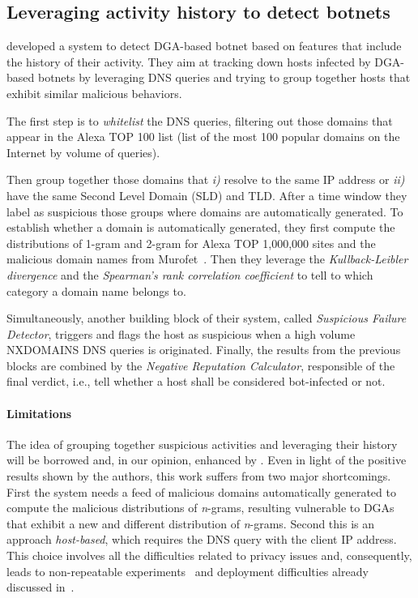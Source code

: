 \subsection{Leveraging activity history to detect botnets} %
\label{sub:a_novel_reputation_system_to_detect_dga_based_botnets}
\citet{sharifnya2013} developed a system to detect DGA-based botnet based on
features that include
the history of their activity. They aim at tracking down hosts infected by DGA-based
botnets by leveraging DNS queries and trying to group together hosts that exhibit
similar malicious behaviors.

The first step is to \emph{whitelist} the DNS queries, filtering
out those domains that appear in the Alexa TOP 100 list (list of the most 100 popular
domains on the Internet by volume of queries).

Then \citet{sharifnya2013} group together those domains that \emph{i)} resolve to
the same IP address or \emph{ii)} have the same Second Level Domain (SLD) and TLD. After a time window
they label as suspicious those groups where domains are automatically generated. To
establish whether a domain is automatically generated, they first compute
the distributions of 1-gram and 2-gram for Alexa TOP 1,000,000 sites and the
malicious domain names from Murofet~\cite{sharifnya2013}. Then they leverage the
\emph{Kullback-Leibler divergence} and the \emph{Spearman's rank correlation
coefficient} to tell to which category a domain name belongs to.

Simultaneously, another building block of their system, called \emph{Suspicious
Failure Detector}, triggers and flags the host as suspicious when a high volume
NXDOMAINS DNS queries is originated.
Finally, the results from the previous blocks are combined by the \emph{Negative
Reputation Calculator}, responsible of the final verdict, i.e., tell whether a host
shall be considered bot-infected or not.

\paragraph{Limitations} The idea of grouping together suspicious activities and leveraging their history will be
borrowed and, in our opinion, enhanced by \thesystem.
Even in light of the positive results shown
by the authors, this work suffers from two major shortcomings. First the system needs
a feed of malicious domains automatically generated to compute the
malicious distributions of \emph{n}-grams, resulting vulnerable to DGAs that exhibit a new and different distribution of \emph{n}-grams. Second this is an approach
\emph{host-based}, which requires the DNS query with the client IP address. This
choice involves all the difficulties related to privacy issues and, consequently,
leads to non-repeatable experiments~\cite{rossow2011} and deployment difficulties already
discussed in~\cite{schiavoni2013}.

